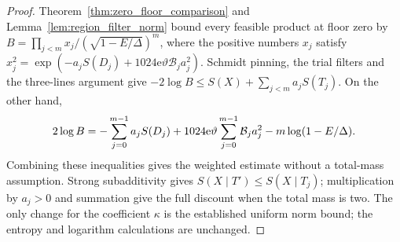 \begin{proof}
    \leanok
    Theorem~\ref{thm:zero_floor_comparison} and
    Lemma~\ref{lem:region_filter_norm} bound every feasible product at
    floor zero by $B=\prod_{j<m}x_j/(\sqrt{1-E/\Delta})^m$, where the
    positive numbers $x_j$ satisfy $x_j^2=\exp(-a_jS(D_j)+1024\mathrm e\vartheta\mathcal B_ja_j^2)$.
    Schmidt pinning, the trial filters and the three-lines argument give
    $-2\log B\le S(X)+\sum_{j<m}a_jS(T_j)$. On the other hand,
    \begin{align}
        2\log B=-\sum_{j=0}^{m-1}a_jS(D_j)
        +1024\mathrm e\vartheta\sum_{j=0}^{m-1}\mathcal B_ja_j^2
        -m\log(1-E/\Delta).\notag
    \end{align}
    Combining these inequalities gives the weighted estimate without a
    total-mass assumption. Strong subadditivity gives
    $S(X\mid T')\le S(X\mid T_j)$; multiplication by $a_j>0$ and summation
    give the full discount when the total mass is two. The only change
    for the coefficient $\kappa$ is the established uniform norm bound;
    the entropy and logarithm calculations are unchanged.
\end{proof}

